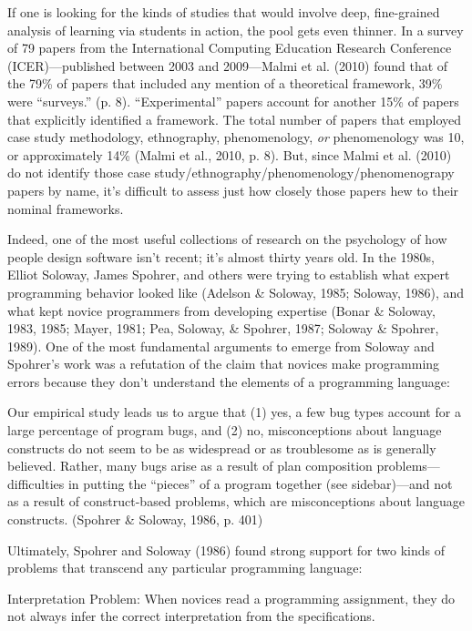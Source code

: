 If one is looking for the kinds of studies that would involve deep,
fine-grained analysis of learning via students in action, the pool gets
even thinner. In a survey of 79 papers from the International Computing
Education Research Conference (ICER)---published between 2003 and
2009---Malmi et al. (2010) found that of the 79\% of papers that
included any mention of a theoretical framework, 39\% were ``surveys.''
(p. 8). ``Experimental'' papers account for another 15\% of papers that
explicitly identified a framework. The total number of papers that
employed case study methodology, ethnography, phenomenology, \emph{or}
phenomenology was 10, or approximately 14\% (Malmi et al., 2010, p. 8).
But, since Malmi et al. (2010) do not identify those case
study/ethnography/phenomenology/phenomenograpy papers by name, it's
difficult to assess just how closely those papers hew to their nominal
frameworks.

Indeed, one of the most useful collections of research on the psychology
of how people design software isn't recent; it's almost thirty years
old. In the 1980s, Elliot Soloway, James Spohrer, and others were trying
to establish what expert programming behavior looked like (Adelson \&
Soloway, 1985; Soloway, 1986), and what kept novice programmers from
developing expertise (Bonar \& Soloway, 1983, 1985; Mayer, 1981; Pea,
Soloway, \& Spohrer, 1987; Soloway \& Spohrer, 1989). One of the most
fundamental arguments to emerge from Soloway and Spohrer's work was a
refutation of the claim that novices make programming errors because
they don't understand the elements of a programming language:

Our empirical study leads us to argue that (1) yes, a few bug types
account for a large percentage of program bugs, and (2) no,
misconceptions about language constructs do not seem to be as widespread
or as troublesome as is generally believed. Rather, many bugs arise as a
result of plan composition problems---difficulties in putting the
``pieces'' of a program together (see sidebar)---and not as a result of
construct-based problems, which are misconceptions about language
constructs. (Spohrer \& Soloway, 1986, p. 401)

Ultimately, Spohrer and Soloway (1986) found strong support for two
kinds of problems that transcend any particular programming language:

Interpretation Problem: When novices read a programming assignment, they
do not always infer the correct interpretation from the specifications.

